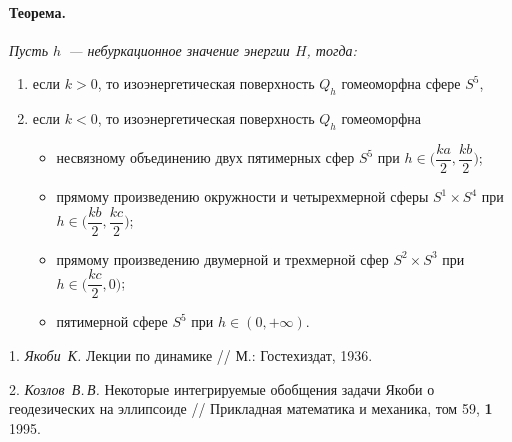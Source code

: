 	\paragraph{Теорема.} {\it Пусть $h$~--- небуркационное значение энергии $H$, тогда:
	\begin{enumerate}
		\item если $k>0$, то изоэнергетическая поверхность $Q_h$ гомеоморфна сфере $S^5$,
		\item если $k<0$, то изоэнергетическая поверхность $Q_h$ гомеоморфна
		\begin{itemize}
			\item несвязному объединению двух пятимерных сфер $S^5$ при $h \in \Big(\dfrac{ka}{2}, \dfrac{kb}{2}\Big)$;
			\item прямому произведению окружности и четырехмерной сферы ${S^1\times S^4}$ при $h \in \Big(\dfrac{kb}{2}, \dfrac{kc}{2}\Big)$;
			\item прямому произведению двумерной и трехмерной сфер $S^2\times S^3$ при $h\in \Big(\dfrac{kc}{2}, 0\Big)$;
			\item пятимерной сфере $S^5$ при $h \in (0, +\infty)$.
		\end{itemize}
	\end{enumerate}
    }
\litlist

1. {\it  Якоби~К.} Лекции по динамике // М.: Гостехиздат, 1936.

2. {\it Козлов~В.\,В.} Некоторые интегрируемые обобщения задачи Якоби о геодезических на эллипсоиде // Прикладная математика и механика, том 59, {\bf1} 1995.

